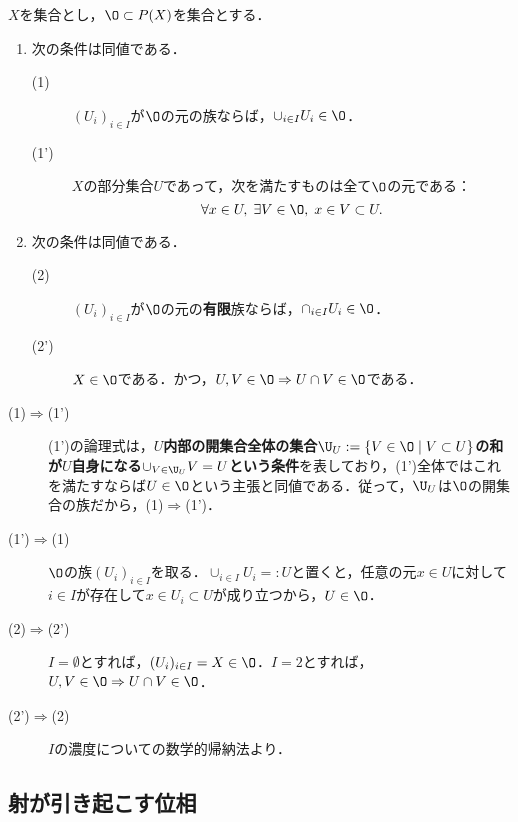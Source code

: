 \documentclass[uplatex,dvipdfmx]{jsreport}
\begin{document}
\begin{proposition}[開集合の公理の特徴付け]\label{prop-characterization-of-open-sets}
    $X$を集合とし，$\O\subset P(X)$を集合とする．
    \begin{enumerate}
        \item 次の条件は同値である．\begin{description}
            \item[(1)] $(U_i)_{i\in I}$が$\O$の元の族ならば，$\cup_{i\in I}U_i\in\O$．
            \item[(1')] $X$の部分集合$U$であって，次を満たすものは全て$\O$の元である：\[\forall x\in U,\; \exists V\in\O,\;x\in V\subset U.\]
        \end{description}
        \item 次の条件は同値である．\begin{description}
            \item[(2)] $(U_i)_{i\in I}$が$\O$の元の\textbf{有限}族ならば，$\cap_{i\in I}U_i\in\O$．
            \item[(2')] $X\in\O$である．かつ，$U,V\in\O\Rightarrow U\cap V\in\O$である．
        \end{description}
    \end{enumerate}
\end{proposition}
\begin{Proof}\mbox{}
    \begin{description}
        \item[(1)$\Rightarrow$(1')] (1')の論理式は，\textbf{$U$内部の開集合全体の集合$\U_U:=\{V\in\O\mid V\subset U\}$の和が$U$自身になる$\cup_{V\in\U_U}V=U$という条件}を表しており，(1')全体ではこれを満たすならば$U\in\O$という主張と同値である．従って，$\U_U$は$\O$の開集合の族だから，(1)$\Rightarrow$(1')．
        \item[(1')$\Rightarrow$(1)] $\O$の族$(U_i)_{i\in I}$を取る．$\cup_{i\in I}U_i=:U$と置くと，任意の元$x\in U$に対して$i\in I$が存在して$x\in U_i\subset U$が成り立つから，$U\in\O$．
        \item[(2)$\Rightarrow$(2')] $I=\emptyset$とすれば，$(U_i)_{i\in I}=X\in\O$．$I=2$とすれば，$U,V\in\O\Rightarrow U\cap V\in\O$．
        \item[(2')$\Rightarrow$(2)] $I$の濃度についての数学的帰納法より．
    \end{description}
\end{Proof}

\subsection{射が引き起こす位相}
\end{document}
